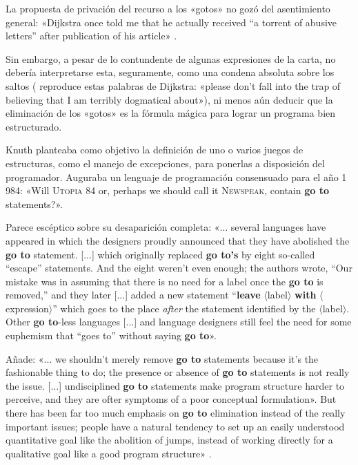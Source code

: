 La propuesta de privación del recurso a los «gotos» no gozó
del asentimiento general: «Dijkstra once told me that he
actually received “a torrent of abusive letters” after
publication of his article» \citep[p. 265]{1974_Knuth}.

Sin embargo, a pesar de lo contundente de algunas
expresiones de la carta, no debería interpretarse esta,
seguramente, como una condena absoluta sobre los saltos
(\citet{1974_Knuth} reproduce estas palabras de Dijkstra:
«please don’t fall into the trap of believing that I am
terribly dogmatical about»), ni menos aún deducir que la
eliminación de los «gotos» es la fórmula mágica para lograr
un programa bien estructurado.

Knuth planteaba como objetivo la definición de uno o varios
juegos de estructuras, como el manejo de excepciones, para
ponerlas a disposición del programador. Auguraba un lenguaje
de programación consensuado para el año 1\,984: «Will
\textsc{Utopia 84} or, perhaps we should call it
\textsc{Newspeak}, contain {\bf go to} statements?».

Parece escéptico sobre su desaparición completa:
«... several languages have appeared in which the designers
proudly announced that they have abolished the \textbf{go
  to} statement. [...] which originally replaced \textbf{go
  to’s} by eight so-called “escape” statements. And the
eight weren’t even enough; the authors wrote, “Our mistake
was in assuming that there is no need for a label once the
\textbf{go to} is removed,” and they later [...] added a new
statement “\textbf{leave} $\langle$label$\rangle$
\textbf{with} $\langle$expression$\rangle$” which goes to
the place \emph{after} the statement identified by the
$\langle$label$\rangle$. Other \textbf{go to}-less languages
[...] and language designers still feel the need for some
euphemism that “goes to” without saying \textbf{go to}».

Añade: «... we shouldn’t merely remove \textbf{go to}
statements because it’s the fashionable thing to do; the
presence or absence of \textbf{go to} statements is not
really the issue. [...] undisciplined \textbf{go to}
statements make program structure harder to perceive, and
they are ofter symptoms of a poor conceptual
formulation». But there has been far too much emphasis on
\textbf{go to} elimination instead of the really important
issues; people have a natural tendency to set up an easily
understood quantitative goal like the abolition of jumps,
instead of working directly for a qualitative goal like a
good program structure» \citep{1974_Knuth}.


